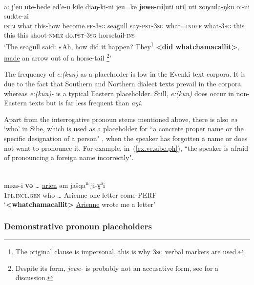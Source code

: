\documentclass[output=paper,colorlinks,citecolor=brown
\ChapterDOI{10.5281/zenodo.15697577}
]{langscibook}
\begin{document}
 \ea \label{ex.what.ude.ph}
 \\
 \gll a: j’eu ute-bede ed’e-u kile diaŋ-ki-ni jeu=ke \textbf{jewe-ni}[uti uti] uti zoŋcula-ŋku \uline{o:-ni} su:kte-zi\\
\textsc{intj} what this-how become.\textsc{pf}-\textsc{3sg} seagull say-\textsc{pst}-\textsc{3sg} what=\textsc{indef} what-\textsc{3sg} this this this shoot-\textsc{nmlz} do.\textsc{pst}-\textsc{3sg} horsetail-\textsc{ins}\\
\glt `The seagull said: «Ah, how did it happen? They\footnote{The original clause is impersonal, this is why \textsc{3sg} verbal markers are used.} \textbf{<did whatchamacallit>}, \uline{made} an arrow out of a horse-tail \footnote{Despite its form, \textit{jewe-} is probably not an accusative form, see \citet[324]{holzl2018typology} for a discussion.}'\\
 \z
{}
 

The frequency of \textit{e:(kun)} as a placeholder is low in the Evenki text corpora. It is due to the fact that Southern and Northern dialect texts prevail in the corpora, whereas \textit{e:(kun)-} is a typical Eastern placeholder. Still, \textit{e:(kun)} does occur in non-Eastern texts but is far less frequent than \textit{aŋi}.

Apart from the interrogative pronoun stems mentioned above, there is also \textit{və} `who' in Sibe, which is used as a placeholder for ``a concrete proper name or
the specific designation of a person" \citep[111]{zikmundova2013spoken}, when the speaker has forgotten a name or does not want to pronounce it. For example, in~(\ref{ex.ve.sibe.ph}), ``the speaker is afraid of pronouncing a foreign name incorrectly".


 \ea \label{ex.ve.sibe.ph}
 \\
 \gll məzə-i \textbf{və} … \uline{arien} əm jašqa\textsuperscript{n} ji-ɣ\textsuperscript{ə}i\\
\textsc{1pl.incl.gen} who … Arienne one letter come-PERF\\
\glt `\textbf{<whatchamacallit>} \uline{Arienne} wrote me a letter'\\
 \z
{}

\subsubsection{Demonstrative pronoun placeholders}
\end{document}
